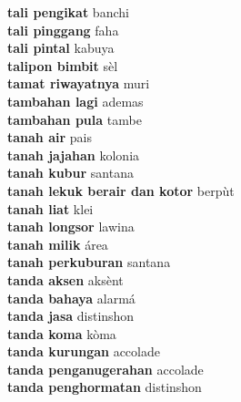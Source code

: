 \textbf{ tali pengikat  } banchi \\
\textbf{ tali pinggang  } faha \\
\textbf{ tali pintal  } kabuya \\
\textbf{ talipon bimbit  } sèl \\
\textbf{ tamat riwayatnya  } muri \\
\textbf{ tambahan lagi  } ademas \\
\textbf{ tambahan pula  } tambe \\
\textbf{ tanah air  } pais \\
\textbf{ tanah jajahan  } kolonia \\
\textbf{ tanah kubur  } santana \\
\textbf{ tanah lekuk berair dan kotor  } berpùt \\
\textbf{ tanah liat  } klei \\
\textbf{ tanah longsor  } lawina \\
\textbf{ tanah milik  } área \\
\textbf{ tanah perkuburan  } santana \\
\textbf{ tanda aksen  } aksènt \\
\textbf{ tanda bahaya  } alarmá \\
\textbf{ tanda jasa  } distinshon \\
\textbf{ tanda koma  } kòma \\
\textbf{ tanda kurungan  } accolade \\
\textbf{ tanda penganugerahan  } accolade \\
\textbf{ tanda penghormatan  } distinshon \\
